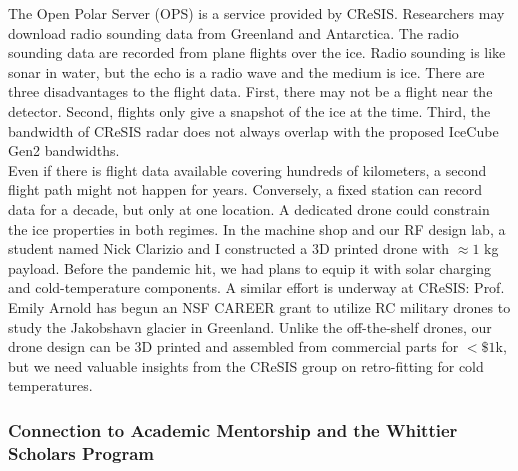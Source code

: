 \documentclass[../../../main.tex]{subfiles}
\begin{document}
The Open Polar Server (OPS) is a service provided by CReSIS.  Researchers may download radio sounding data from Greenland and Antarctica.  The radio sounding data are recorded from plane flights over the ice.  Radio sounding is like sonar in water, but the echo is a radio wave and the medium is ice.  There are three disadvantages to the flight data.  First, there may not be a flight near the detector.  Second, flights only give a snapshot of the ice at the time.  Third, the bandwidth of CReSIS radar does not always overlap with the proposed IceCube Gen2 bandwidths.
\\
\vspace{0.15cm}
Even if there is flight data available covering hundreds of kilometers, a second flight path might not happen for years.  Conversely, a fixed station can record data for a decade, but only at one location.  A dedicated drone could constrain the ice properties in both regimes.  In the machine shop and our RF design lab, a student named Nick Clarizio and I constructed a 3D printed drone with $\approx 1$ kg payload.  Before the pandemic hit, we had plans to equip it with solar charging and cold-temperature components.  A similar effort is underway at CReSIS: Prof. Emily Arnold has begun an NSF CAREER grant to utilize RC military drones to study the Jakobshavn glacier in Greenland.  Unlike the off-the-shelf drones, our drone design can be 3D printed and assembled from commercial parts for $< \$1$k, but we need valuable insights from the CReSIS group on retro-fitting for cold temperatures.

\subsubsection{Connection to Academic Mentorship and the Whittier Scholars Program}
\end{document}
